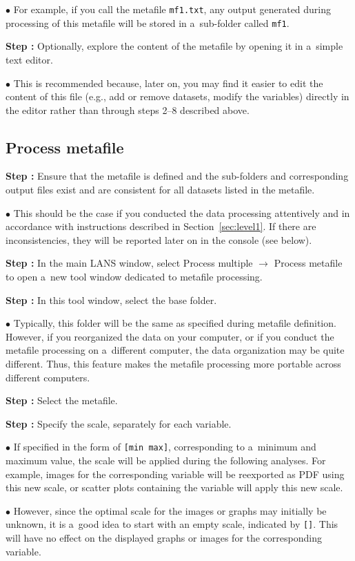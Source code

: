 \documentclass[a4paper, 11pt]{article}
\newcommand{\ttt}[1]{\texttt{#1}}
\newcommand{\lans}[1]{{\color{magenta}#1}}
\newcommand{\lanstf}[1]{{\color{cyan}#1}}
\newcommand\ra{\rightarrow}
\newcounter{step}
\newcommand\s{\addtocounter{step}{1}\noindent\textbf{Step \thestep:}{ }}
\newcommand\bul{\noindent$\bullet${ }}
\begin{document}
\bul For example, if you call the metafile \ttt{mf1.txt}, any output generated during processing of this metafile will be stored in a~sub-folder called \ttt{mf1}.

\s Optionally, explore the content of the metafile by opening it in a~simple text editor.

\bul This is recommended because, later on, you may find it easier to edit the content of this file (e.g., add or remove datasets, modify the variables) directly in the editor rather than through steps 2--8 described above.


\subsection{Process metafile}
\setcounter{step}{0}

\s Ensure that the metafile is defined and the sub-folders and corresponding output files exist and are consistent for all datasets listed in the metafile.

\bul This should be the case if you conducted the data processing attentively and in accordance with instructions described in Section~\ref{sec:level1}. If there are inconsistencies, they will be reported later on in the console (see below).

\s In the main LANS window, select \lans{Process multiple} $\ra$ \lans{Process metafile} to open a~new tool window dedicated to metafile processing.

\s In this tool window, select the \lanstf{base folder}.

\bul Typically, this folder will be the same as specified during metafile definition. However, if you reorganized the data on your computer, or if you conduct the metafile processing on a~different computer, the data organization may be quite different. Thus, this feature makes the metafile processing more portable across different computers.

\s Select the \lanstf{metafile}.

\s Specify  the \lanstf{scale}, separately for each variable.

\bul If specified in the form of \ttt{[min max]}, corresponding to a~minimum and maximum value, the scale will be applied during the following analyses. For example, images for the corresponding variable will be reexported as PDF using this new scale, or scatter plots containing the variable will apply this new scale.

\bul However, since the optimal scale for the images or graphs may initially be unknown, it is a~good idea to start with an empty scale, indicated by \ttt{[]}. This will have no effect on the displayed graphs or images for the corresponding variable.
\end{document}
